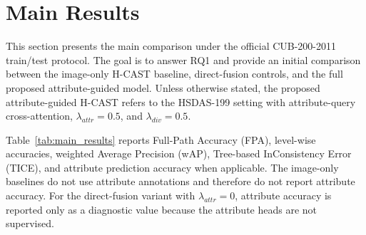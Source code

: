 \section{Main Results}

This section presents the main comparison under the official CUB-200-2011 train/test protocol. The goal is to answer RQ1 and provide an initial comparison between the image-only H-CAST baseline, direct-fusion controls, and the full proposed attribute-guided model. Unless otherwise stated, the proposed attribute-guided H-CAST refers to the HSDAS-199 setting with attribute-query cross-attention, \(\lambda_{attr}=0.5\), and \(\lambda_{div}=0.5\).

Table~\ref{tab:main_results} reports Full-Path Accuracy (FPA), level-wise accuracies, weighted Average Precision (wAP), Tree-based InConsistency Error (TICE), and attribute prediction accuracy when applicable. The image-only baselines do not use attribute annotations and therefore do not report attribute accuracy. For the direct-fusion variant with \(\lambda_{attr}=0\), attribute accuracy is reported only as a diagnostic value because the attribute heads are not supervised.

